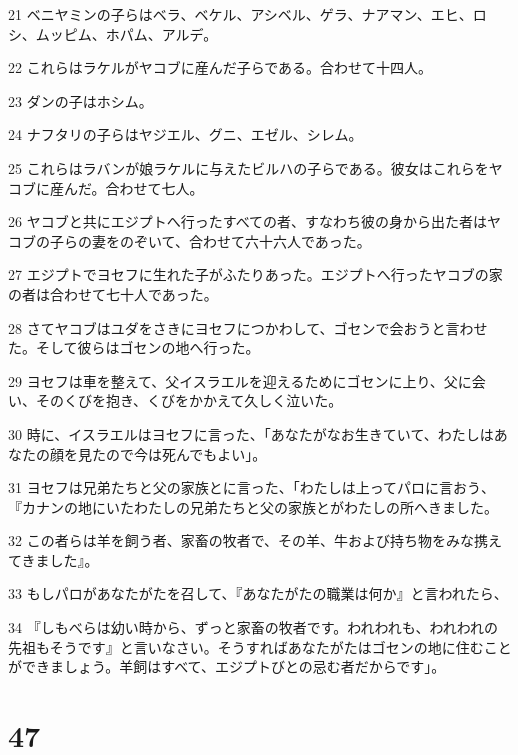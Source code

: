\par 21 ベニヤミンの子らはベラ、ベケル、アシベル、ゲラ、ナアマン、エヒ、ロシ、ムッピム、ホパム、アルデ。
\par 22 これらはラケルがヤコブに産んだ子らである。合わせて十四人。
\par 23 ダンの子はホシム。
\par 24 ナフタリの子らはヤジエル、グニ、エゼル、シレム。
\par 25 これらはラバンが娘ラケルに与えたビルハの子らである。彼女はこれらをヤコブに産んだ。合わせて七人。
\par 26 ヤコブと共にエジプトへ行ったすべての者、すなわち彼の身から出た者はヤコブの子らの妻をのぞいて、合わせて六十六人であった。
\par 27 エジプトでヨセフに生れた子がふたりあった。エジプトへ行ったヤコブの家の者は合わせて七十人であった。
\par 28 さてヤコブはユダをさきにヨセフにつかわして、ゴセンで会おうと言わせた。そして彼らはゴセンの地へ行った。
\par 29 ヨセフは車を整えて、父イスラエルを迎えるためにゴセンに上り、父に会い、そのくびを抱き、くびをかかえて久しく泣いた。
\par 30 時に、イスラエルはヨセフに言った、「あなたがなお生きていて、わたしはあなたの顔を見たので今は死んでもよい」。
\par 31 ヨセフは兄弟たちと父の家族とに言った、「わたしは上ってパロに言おう、『カナンの地にいたわたしの兄弟たちと父の家族とがわたしの所へきました。
\par 32 この者らは羊を飼う者、家畜の牧者で、その羊、牛および持ち物をみな携えてきました』。
\par 33 もしパロがあなたがたを召して、『あなたがたの職業は何か』と言われたら、
\par 34 『しもべらは幼い時から、ずっと家畜の牧者です。われわれも、われわれの先祖もそうです』と言いなさい。そうすればあなたがたはゴセンの地に住むことができましょう。羊飼はすべて、エジプトびとの忌む者だからです」。

\chapter{47}

